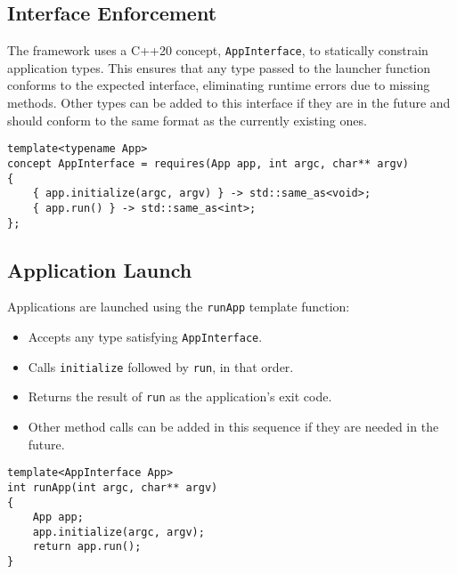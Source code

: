 \subsection*{Interface Enforcement}
The framework uses a C++20 concept, \texttt{AppInterface}, to statically constrain application types. This ensures that any type passed to the launcher function conforms to the expected interface, eliminating runtime errors due to missing methods. Other types can be added to this interface if they are in the future and should conform to the same format as the currently existing ones. 

\begin{lstlisting}[style=cppstyle]
template<typename App>
concept AppInterface = requires(App app, int argc, char** argv) 
{
    { app.initialize(argc, argv) } -> std::same_as<void>;
    { app.run() } -> std::same_as<int>;
};
\end{lstlisting}

\subsection*{Application Launch}
Applications are launched using the \texttt{runApp} template function:
\begin{itemize}\itemsep0em
	\item Accepts any type satisfying \texttt{AppInterface}.
	\item Calls \texttt{initialize} followed by \texttt{run}, in that order.
	\item Returns the result of \texttt{run} as the application's exit code.
	\item Other method calls can be added in this sequence if they are needed in the future.
\end{itemize}
\begin{lstlisting}[style=cppstyle]
template<AppInterface App>
int runApp(int argc, char** argv)
{
    App app;
    app.initialize(argc, argv);
    return app.run();
}
\end{lstlisting}

